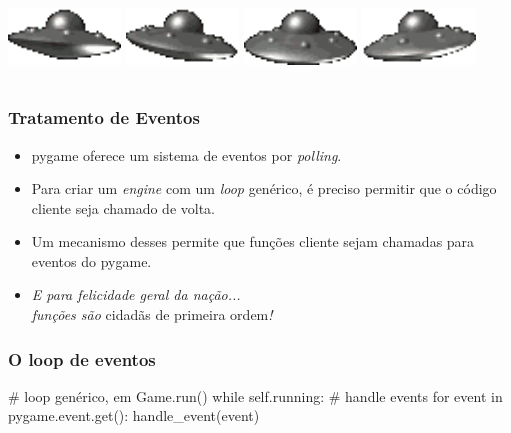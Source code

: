 \begin{frame}
\begin{columns}
        \begin{column}{0.3\textwidth}
            \includegraphics[width=3cm]{images/out0002.png}
            \vfill
            \includegraphics[width=3cm]{images/out0005.png}
            \vfill
            \includegraphics[width=3cm]{images/out0008.png}
            \vfill
            \includegraphics[width=3cm]{images/out0011.png}
        \end{column}
    \end{columns}
\end{frame}

\begin{frame}
    \frametitle{Tratamento de Eventos}

    \begin{itemize}
        \item pygame oferece um sistema de eventos por \textit{polling}.
        \item Para criar um \textit{engine} com um \textit{loop} genérico,
        é preciso permitir que o código cliente seja chamado de volta.
        \item Um mecanismo desses permite que funções cliente sejam chamadas
        para eventos do pygame.
        \item \textit{E para felicidade geral da nação...\\ funções são} cidadãs de primeira ordem\textit{!}
    \end{itemize}
\end{frame}

\begin{frame}[fragile]
    \frametitle{O loop de eventos}

    \begin{python}
    # loop genérico, em Game.run()
    while self.running:
        # handle events
        for event in pygame.event.get():
            handle_event(event)
    \end{python}
\end{frame}

